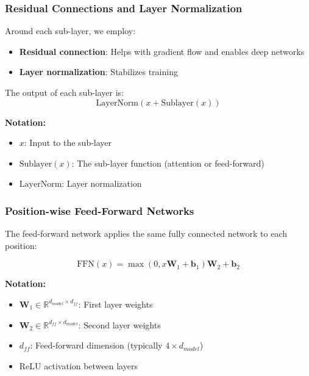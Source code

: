 \documentclass[11pt]{article}
\begin{document}
\subsubsection{Residual Connections and Layer Normalization}

Around each sub-layer, we employ:
\begin{itemize}
    \item \textbf{Residual connection}: Helps with gradient flow and enables deep networks
    \item \textbf{Layer normalization}: Stabilizes training
\end{itemize}

The output of each sub-layer is:
\begin{equation}
\text{LayerNorm}(x + \text{Sublayer}(x))
\end{equation}
\begin{notationbox}
\textbf{Notation:}
\begin{itemize}
    \item $x$: Input to the sub-layer
    \item $\text{Sublayer}(x)$: The sub-layer function (attention or feed-forward)
    \item $\text{LayerNorm}$: Layer normalization
\end{itemize}
\end{notationbox}

\subsubsection{Position-wise Feed-Forward Networks}

The feed-forward network applies the same fully connected network to each position:

\begin{equation}
\text{FFN}(x) = \max(0, x\mathbf{W}_1 + \mathbf{b}_1)\mathbf{W}_2 + \mathbf{b}_2
\end{equation}
\begin{notationbox}
\textbf{Notation:}
\begin{itemize}
    \item $\mathbf{W}_1 \in \mathbb{R}^{d_{model} \times d_{ff}}$: First layer weights
    \item $\mathbf{W}_2 \in \mathbb{R}^{d_{ff} \times d_{model}}$: Second layer weights
    \item $d_{ff}$: Feed-forward dimension (typically $4 \times d_{model}$)
    \item ReLU activation between layers
\end{itemize}
\end{notationbox}
\end{document}

